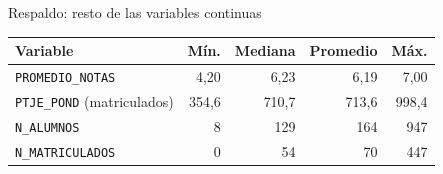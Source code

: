 \begin{frame}{Respaldo: resto de las variables continuas}
  \begin{center}
  \begin{tabular}{lrrrr}
    \toprule
    \textbf{Variable} & \textbf{Mín.} & \textbf{Mediana} & \textbf{Promedio} & \textbf{Máx.} \\
    \midrule
    \texttt{PROMEDIO\_NOTAS}           & 4,20  & 6,23  & 6,19  & 7,00 \\
    \texttt{PTJE\_POND} (matriculados) & 354,6 & 710,7 & 713,6 & 998,4 \\
    \texttt{N\_ALUMNOS}                & 8     & 129   & 164   & 947 \\
    \texttt{N\_MATRICULADOS}           & 0     & 54    & 70    & 447 \\
    \bottomrule
  \end{tabular}
  \end{center}
\end{frame}


